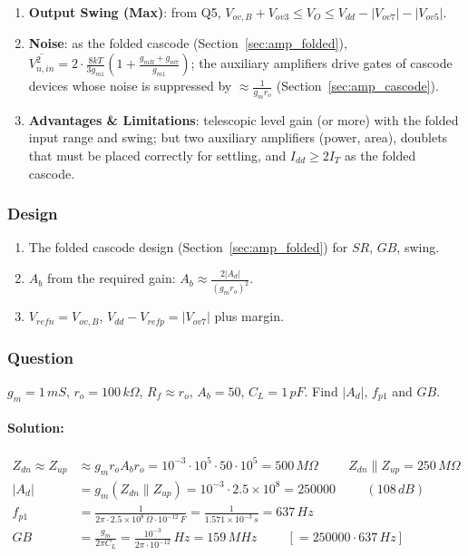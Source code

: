 \begin{enumerate}
    \paragraph{At Output:} \(Z_{out} = Z_{dn} \parallel Z_{up} \approx \frac{g_m r_o A_b r_o}{2}\) per side.
  \item \textbf{Output Swing (Max)}: from Q5, \(V_{ov,B} + V_{ov3} \leq V_O \leq V_{dd} - |V_{ov7}| - |V_{ov5}|\).
  \item \textbf{Noise}: as the folded cascode (Section~\ref{sec:amp_folded}),
    \(\overline{V_{n,in}^2} = 2\cdot\frac{8kT}{3g_{m1}}\left(1 + \frac{g_{mB} + g_{m7}}{g_{m1}}\right)\); the auxiliary amplifiers drive gates of cascode
    devices whose noise is suppressed by \(\approx \frac{1}{g_m r_o}\) (Section~\ref{sec:amp_cascode}).
  \item \textbf{Advantages \& Limitations}: telescopic level gain (or more) with the folded input
    range and swing; but two auxiliary amplifiers (power, area), doublets that must be placed
    correctly for settling, and \(I_{dd} \geq 2 I_T\) as the folded cascode.
\end{enumerate}

\subsubsection{Design}
\begin{enumerate}
  \item The folded cascode design (Section~\ref{sec:amp_folded}) for \(SR\), \(GB\), swing.
  \item \(A_b\) from the required gain: \(A_b \approx \frac{2 |A_d|}{(g_m r_o)^2}\).
  \item \(V_{refn} = V_{ov,B}\), \(V_{dd} - V_{refp} = |V_{ov7}|\) plus margin.
\end{enumerate}

\subsubsection{Question}
\(g_m = 1\,mS\), \(r_o = 100\,k\Omega\), \(R_f \approx r_o\), \(A_b = 50\), \(C_L = 1\,pF\). Find \(|A_d|\),
\(f_{p1}\) and \(GB\).
\paragraph{Solution:}
\begin{align*}
  Z_{dn} \approx Z_{up} &\approx g_m r_o A_b r_o = 10^{-3} \cdot 10^{5} \cdot 50 \cdot 10^{5} = 500\,M\Omega \hspace{1cm}
  Z_{dn} \parallel Z_{up} = 250\,M\Omega \\
  |A_d| &= g_m (Z_{dn} \parallel Z_{up}) = 10^{-3} \cdot 2.5 \times 10^{8} = 250000 \hspace{1cm} (108\,dB) \\
  f_{p1} &= \frac{1}{2\pi \cdot 2.5 \times 10^{8}\,\Omega \cdot 10^{-12}\,F} = \frac{1}{1.571 \times 10^{-3}\,s} = 637\,Hz \\
  GB &= \frac{g_m}{2\pi C_L} = \frac{10^{-3}}{2\pi \cdot 10^{-12}}\,Hz = 159\,MHz \hspace{1cm} [= 250000 \cdot 637\,Hz]
\end{align*}

